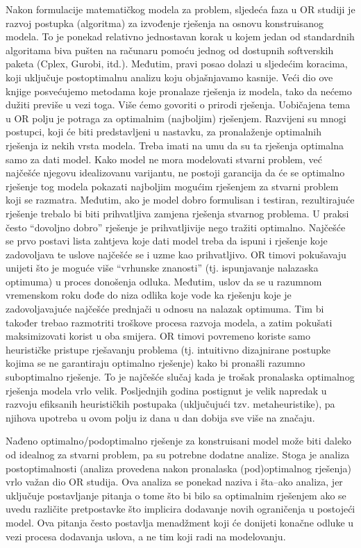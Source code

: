 \documentclass[a4paper, utf8, 11pt, colorlinks]{article}
\begin{document}
Nakon formulacije matematičkog modela za problem, sljedeća faza u OR studiji je razvoj postupka (algoritma) za
izvođenje rješenja na osnovu konstruisanog modela. To je ponekad relativno jednostavan korak u kojem jedan od standardnih algoritama biva pušten na računaru pomoću jednog od   dostupnih softverskih paketa (Cplex, Gurobi, itd.). Međutim, pravi posao dolazi u sljedećim koracima, koji uključuje postoptimalnu
analizu koju objašnjavamo kasnije. Veći dio ove knjige posvećujemo metodama koje pronalaze rješenja iz modela, tako da nećemo dužiti previše u vezi toga. Više ćemo govoriti o prirodi   rješenja.  Uobičajena tema u OR polju je potraga za optimalnim (najboljim) rješenjem. Razvijeni su mnogi postupci, koji će biti predstavljeni u nastavku, za pronala\-ženje optimalnih rješenja iz nekih vrsta modela. Treba imati na umu da su ta rješenja optimalna samo za dati model. Kako model ne mora modelovati stvarni problem, već najčešće njegovu idealizovanu varijantu, ne postoji garancija da će se optimalno rješenje tog modela pokazati najboljim mogućim rješenjem za stvarni problem koji se razmatra. Međutim, ako je
model dobro formulisan i testiran, rezultirajuće rješenje trebalo bi biti prihvatljiva zamjena rješenja stvarnog problema. U praksi često ``dovoljno dobro'' rješenje je prihvatljivije nego tražiti optimalno. Najčešće se prvo postavi lista zahtjeva koje dati model treba da ispuni i rješenje koje zadovoljava te uslove najčešće se i uzme kao prihvatljivo. OR timovi pokušavaju unijeti što je moguće više ``vrhunske znanosti''  (tj. ispunjavanje nalazaska optimuma) u proces donošenja odluka. Međutim,  uslov da se u razumnom vremenskom roku dođe do niza odlika koje vode ka rješenju koje je zadovoljavajuće najčešće prednjači u odnosu na nalazak optimuma. Tim bi također trebao razmotriti troškove procesa razvoja modela, a zatim
pokušati maksimizovati korist u oba smijera. OR timovi povremeno koriste samo heurističke pristupe rješavanju problema (tj. intuitivno dizajnirane postupke kojima se ne garantiraju optimalno rješenje) kako bi pronašli razumno suboptimalno rješenje. To je najčešće slučaj kada je trošak pronalaska  optimalnog rješenja  modela vrlo velik. Posljednjih godina postignut je velik napredak u razvoju efiksanih heurističkih postupaka (uključujući tzv.
metaheuristike), pa njihova upotreba u ovom polju iz dana u dan  dobija sve više na značaju.  

Nađeno optimalno/podoptimalno rješenje za konstruisani model može biti daleko od idealnog za stvarni problem, pa su potrebne dodatne analize. Stoga je analiza postoptimalnosti (analiza provedena nakon pronalaska (pod)optimalnog rješenja) vrlo važan dio   OR studija.  Ova analiza se ponekad naziva i šta--ako analiza, jer uključuje postavljanje pitanja o tome što bi bilo sa optimalnim rješenjem ako se uvedu različite pretpostavke što implicira dodavanje novih ograničenja u postojeći model. Ova pitanja često postavlja menadžment koji će donijeti konačne odluke u vezi procesa dodavanja uslova, a ne tim koji radi na modelovanju.
\end{document}
